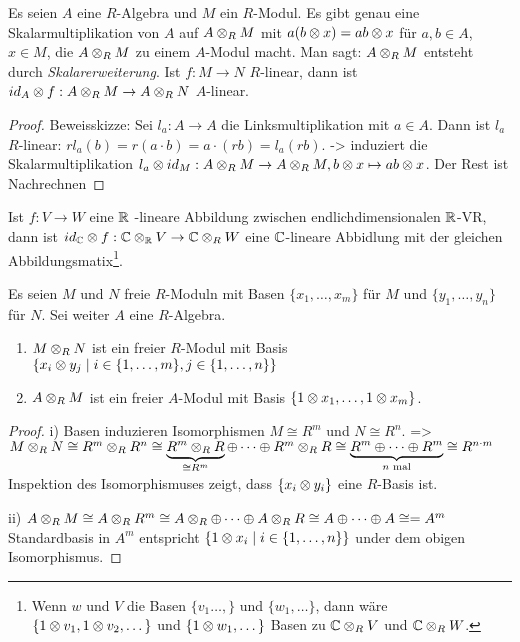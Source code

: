 \documentclass[../main.tex]{subfiles}
\begin{document}
\begin{theorem}[Skalarerweiterung]
    Es seien $A$ eine $R$-Algebra und $M$ ein $R$-Modul.
    Es gibt genau eine Skalarmultiplikation von $A$ auf $A\otimes_R M$ mit $a(b\otimes x) = ab \otimes x$ für $a,b\in A$, $x\in M$, die $A\otimes_R M$ zu einem $A$-Modul macht.
    Man sagt: $A\otimes_R M$ entsteht durch \emph{Skalarerweiterung}.
    Ist $f:M\rightarrow N$ $R$-linear, dann ist $id_A \otimes f: A\otimes_R M \rightarrow A\otimes_R N$ $A$-linear.
\end{theorem}
\begin{proof}
    Beweisskizze:
    Sei $l_a:A\rightarrow A$ die Linksmultiplikation mit $a\in A$. Dann ist $l_a$ $R$-linear:
    $rl_a(b) = r(a\cdot b) = a \cdot (rb) = l_a(rb).$
    -> induziert die Skalarmultiplikation $l_a\otimes id_M:A\otimes_R M\rightarrow A\otimes_R M, b\otimes x\mapsto ab\otimes x$.
    Der Rest ist Nachrechnen
\end{proof}
\begin{example}
    Ist $f:V\rightarrow W$ eine $\mathbb{R}$ -lineare Abbildung
    zwischen endlichdimensionalen $\mathbb{R}$-VR, dann ist $id_{\mathbb{C}} \otimes f: \mathbb{C}\otimes_{\mathbb{R}} V \rightarrow \mathbb{C}\otimes_R W$ eine $\mathbb{C}$-lineare Abbidlung mit der gleichen Abbildungsmatix\footnote{Wenn $w$ und $V$ die Basen $\{v_1\dots,\}$ und $\{w_1,\dots\}$, dann wäre $\{1\otimes v_1,1\otimes v_2,\dots\}$ und $\{1\otimes w_1,\dots\}$ Basen zu $\mathbb{C}\otimes_R V$ und $\mathbb{C}\otimes_R W$.}.
\end{example}

\begin{theorem}
    Es seien $M$ und $N$ freie $R$-Moduln mit Basen $\{x_1,\dots,x_m\}$ für $M$ und $\{y_1,\dots,y_n\}$ für $N$. Sei weiter $A$ eine $R$-Algebra.
    \begin{enumerate}[label=(\roman*)]
        \item $M\otimes_R N$ ist ein freier $R$-Modul mit Basis $\{x_i\otimes y_j\mid i \in \{1,\dots,m\}, j\in \{1,\dots,n\}\}$
        \item $A\otimes_R M$ ist ein freier $A$-Modul mit Basis $\{1\otimes x_1,\dots,1\otimes x_m\}$.
    \end{enumerate}
\end{theorem}
\begin{proof}
i)
    Basen induzieren Isomorphismen $M\cong R^m$ und $N\cong R^n$.
    => $M\otimes_R N\cong R^m \otimes_R R^n \cong \underbrace{R^m \otimes_R R}_{\cong R^m} \oplus \dots \oplus R^m \otimes_R R \cong \underbrace{R^m\oplus\dots\oplus R^m}_{n\text{ mal}} \cong R^{n\cdot m}$
    Inspektion des Isomorphismuses zeigt, dass $\{x_i\otimes y_i\}$ eine $R$-Basis ist.

    ii)
    $A \otimes_R M \cong A \otimes_R R^m \cong A\otimes_R\oplus \dots \oplus A \otimes_R R \cong A\oplus \dots \oplus A \cong = A^m$
    Standardbasis in $A^m$ entspricht $\{1\otimes x_i\mid i\in \{1,\dots, n\}\}$ under dem obigen Isomorphismus.
\end{proof}
\end{document}

